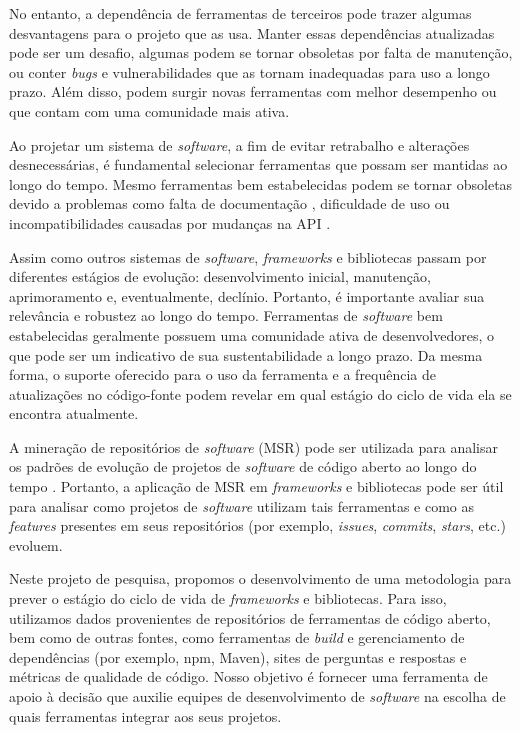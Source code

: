\documentclass[11pt,a4paper]{article}
\newcommand{\en}[1]{\textit{#1}}
\begin{document}
No entanto, a dependência de ferramentas de terceiros pode trazer algumas desvantagens para o projeto que as usa. Manter essas dependências atualizadas pode ser um desafio, algumas podem se tornar obsoletas por falta de manutenção, ou conter \en{bugs} e vulnerabilidades que as tornam inadequadas para uso a longo prazo. Além disso, podem surgir novas ferramentas com melhor desempenho ou que contam com uma comunidade mais ativa.

Ao projetar um sistema de \en{software}, a fim de evitar retrabalho e alterações desnecessárias, é fundamental selecionar ferramentas que possam ser mantidas ao longo do tempo. Mesmo ferramentas bem estabelecidas podem se tornar obsoletas devido a problemas como falta de documentação \cite{robillard2011,zhong2013}, dificuldade de uso \cite{nadi2016} ou incompatibilidades causadas por mudanças na API \cite{mostafa2017,decan2019}.

Assim como outros sistemas de \en{software}, \en{frameworks} e bibliotecas passam por diferentes estágios de evolução: desenvolvimento inicial, manutenção, aprimoramento e, eventualmente, declínio. Portanto, é importante avaliar sua relevância e robustez ao longo do tempo. Ferramentas de \en{software} bem estabelecidas geralmente possuem uma comunidade ativa de desenvolvedores, o que pode ser um indicativo de sua sustentabilidade a longo prazo. Da mesma forma, o suporte oferecido para o uso da ferramenta e a frequência de atualizações no código-fonte podem revelar em qual estágio do ciclo de vida ela se encontra atualmente.

A mineração de repositórios de \en{software} (MSR) pode ser utilizada para analisar os padrões de evolução de projetos de \en{software} de código aberto ao longo do tempo \cite{gold2022,hassan2008}. Portanto, a aplicação de MSR em \en{frameworks} e bibliotecas pode ser útil para analisar como projetos de \en{software} utilizam tais ferramentas e como as \en{features} presentes em seus repositórios (por exemplo, \en{issues}, \en{commits}, \en{stars}, etc.) evoluem.

Neste projeto de pesquisa, propomos o desenvolvimento de uma metodologia para prever o estágio do ciclo de vida de \en{frameworks} e bibliotecas. Para isso, utilizamos dados provenientes de repositórios de ferramentas de código aberto, bem como de outras fontes, como ferramentas de \en{build} e gerenciamento de dependências (por exemplo, npm, Maven), sites de perguntas e respostas e métricas de qualidade de código. Nosso objetivo é fornecer uma ferramenta de apoio à decisão que auxilie equipes de desenvolvimento de \en{software} na escolha de quais ferramentas integrar aos seus projetos.
\end{document}

